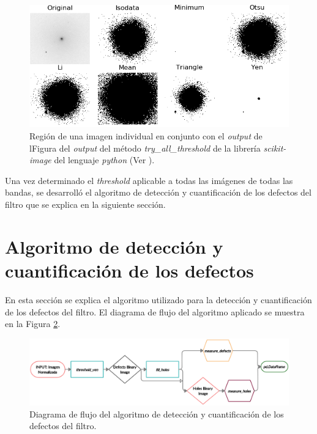 \begin{enumerate}
\begin{figure}[H]
	\centering
	\includegraphics[scale=1.2]{Figs/defectosZEISS/thresh_vivos_compar3.png}
	\caption{Región de una imagen individual en conjunto con el \textit{output} de lFigura del \textit{output} del método \textit{try\_all\_threshold} de la librería \textit{scikit-image} del lenguaje \textit{python} (Ver \href{https://github.com/jrr1984/defects_analysis/blob/master/MAIN/try_all_thresholds.py}{\faGithub}).} 
	\label{fig:threshcom2}
\end{figure}
\end{enumerate}
\hspace{0.5cm}Una vez determinado el \textit{threshold} aplicable a todas las imágenes de todas las bandas, se desarrolló el algoritmo de detección y cuantificación de los defectos del filtro que se explica en la siguiente sección.

\singlespacing
\section{Algoritmo de detección y cuantificación de los defectos \href{https://github.com/jrr1984/defects_analysis/blob/master/MAIN/defects_thresholding.py}{\faGithub}}
\label{sec:secalg}

\hspace{0.5cm}En esta sección se explica el algoritmo utilizado para la detección y cuantificación de los defectos del filtro. El diagrama de flujo del algoritmo aplicado se muestra en la Figura \ref{fig:diagflujoalgor}. 

\begin{figure}[H]
\centering
\includegraphics[scale=0.8]{Figs/cuantificaciondefectos/diag_flujoalgor.png}
\caption{Diagrama de flujo del algoritmo de detección y cuantificación de los defectos del filtro.}
\label{fig:diagflujoalgor}
\end{figure}


